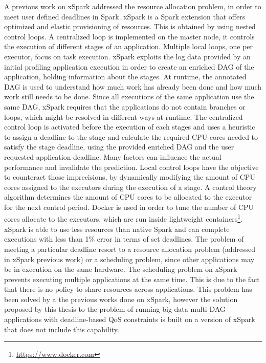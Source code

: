 A previous work on xSpark addressed the resource allocation problem, in order to meet user defined deadlines in Spark. xSpark is a Spark extension that offers optimized and elastic provisioning of resources. This is obtained by using nested control loops. A centralized loop is implemented on the master node, it controls the execution of different stages of an application. Multiple local loops, one per executor, focus on task execution. xSpark exploits the log data provided by an initial profiling
application execution in order to create an enriched DAG of the application, holding  information about the stages. At runtime, the annotated DAG is used to understand how much work has already been done and how much work still needs to be done. Since all executions of the same application use the same DAG, xSpark requires that the applications do not contain branches or loops, which might be resolved in different ways at runtime. The centralized control loop is activated before the execution of each stages and uses a heuristic to assign a deadline to the stage and calculate the required CPU cores needed to satisfy the stage deadline, using the provided enriched DAG and the user requested application deadline. Many factors can influence the actual performance and invalidate the prediction. Local control loops have the objective to
counteract those imprecisions, by dynamically modifying the amount of CPU cores assigned to the executors during the execution of a stage. A control theory algorithm determines the amount of CPU cores to be allocated to the executor for the next control period. Docker is used in order to tune the number of CPU cores allocate to
the executors, which are run inside lightweight containers\footnote{\url{https://www.docker.com}}. xSpark is able to use less resources than native Spark and can complete executions with less than 1\% error in terms of set deadlines.
The problem of meeting a particular deadline resort to a resource allocation problem (addressed in xSpark previous work) or a scheduling problem, since other applications may be in execution on the same hardware.
The scheduling problem on xSpark prevents executing multiple applications at the same time. This is due to the fact that there is no policy to share resources across applications. This problem has been solved by a the previous works done on xSpark, however the solution proposed by this thesis to the problem of running big data multi-DAG applications with deadline-based QoS constraints is built on a version of xSpark that does not include this capability.

